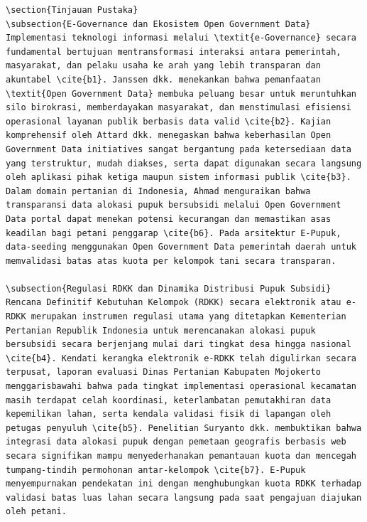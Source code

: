 \documentclass[conference]{IEEEtran}
\begin{document}
\begin{lstlisting}
\section{Tinjauan Pustaka}
\subsection{E-Governance dan Ekosistem Open Government Data}
Implementasi teknologi informasi melalui \textit{e-Governance} secara fundamental bertujuan mentransformasi interaksi antara pemerintah, masyarakat, dan pelaku usaha ke arah yang lebih transparan dan akuntabel \cite{b1}. Janssen dkk. menekankan bahwa pemanfaatan \textit{Open Government Data} membuka peluang besar untuk meruntuhkan silo birokrasi, memberdayakan masyarakat, dan menstimulasi efisiensi operasional layanan publik berbasis data valid \cite{b2}. Kajian komprehensif oleh Attard dkk. menegaskan bahwa keberhasilan Open Government Data initiatives sangat bergantung pada ketersediaan data yang terstruktur, mudah diakses, serta dapat digunakan secara langsung oleh aplikasi pihak ketiga maupun sistem informasi publik \cite{b3}. Dalam domain pertanian di Indonesia, Ahmad menguraikan bahwa transparansi data alokasi pupuk bersubsidi melalui Open Government Data portal dapat menekan potensi kecurangan dan memastikan asas keadilan bagi petani penggarap \cite{b6}. Pada arsitektur E-Pupuk, data-seeding menggunakan Open Government Data pemerintah daerah untuk memvalidasi batas atas kuota per kelompok tani secara transparan.

\subsection{Regulasi RDKK dan Dinamika Distribusi Pupuk Subsidi}
Rencana Definitif Kebutuhan Kelompok (RDKK) secara elektronik atau e-RDKK merupakan instrumen regulasi utama yang ditetapkan Kementerian Pertanian Republik Indonesia untuk merencanakan alokasi pupuk bersubsidi secara berjenjang mulai dari tingkat desa hingga nasional \cite{b4}. Kendati kerangka elektronik e-RDKK telah digulirkan secara terpusat, laporan evaluasi Dinas Pertanian Kabupaten Mojokerto menggarisbawahi bahwa pada tingkat implementasi operasional kecamatan masih terdapat celah koordinasi, keterlambatan pemutakhiran data kepemilikan lahan, serta kendala validasi fisik di lapangan oleh petugas penyuluh \cite{b5}. Penelitian Suryanto dkk. membuktikan bahwa integrasi data alokasi pupuk dengan pemetaan geografis berbasis web secara signifikan mampu menyederhanakan pemantauan kuota dan mencegah tumpang-tindih permohonan antar-kelompok \cite{b7}. E-Pupuk menyempurnakan pendekatan ini dengan menghubungkan kuota RDKK terhadap validasi batas luas lahan secara langsung pada saat pengajuan diajukan oleh petani.


\end{lstlisting}
\end{document}
